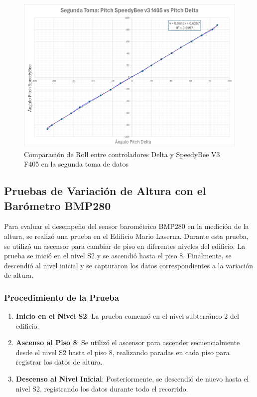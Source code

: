 \begin{figure}[H]
    \centering
    \includegraphics[width=5.5 in]{Imagenes/Pruebas/pitch_2_compare.png}
    \caption{Comparación de Roll entre controladores Delta y SpeedyBee V3 F405 en la segunda toma de datos }
    \label{fig:comparacionPitch2}
\end{figure}


\subsection{Pruebas de Variación de Altura con el Barómetro BMP280}

Para evaluar el desempeño del sensor barométrico BMP280 en la medición de la altura, se realizó una prueba en el Edificio Mario Laserna. Durante esta prueba, se utilizó un ascensor para cambiar de piso en diferentes niveles del edificio. La prueba se inició en el nivel S2 y se ascendió hasta el piso 8. Finalmente, se descendió al nivel inicial y se capturaron los datos correspondientes a la variación de altura.

\subsubsection{Procedimiento de la Prueba}

\begin{enumerate}
    \item \textbf{Inicio en el Nivel S2}: La prueba comenzó en el nivel subterráneo 2 del edificio.
    \item \textbf{Ascenso al Piso 8}: Se utilizó el ascensor para ascender secuencialmente desde el nivel S2 hasta el piso 8, realizando paradas en cada piso para registrar los datos de altura.
    \item \textbf{Descenso al Nivel Inicial}: Posteriormente, se descendió de nuevo hasta el nivel S2, registrando los datos durante todo el recorrido.
\end{enumerate}

